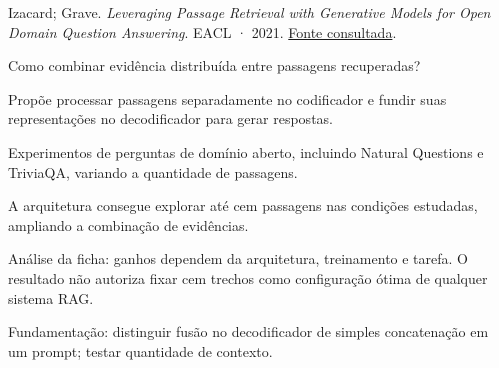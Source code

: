 {\small Izacard; Grave. \textit{Leveraging Passage Retrieval with Generative Models for Open Domain Question Answering}. EACL · 2021. \href{https://aclanthology.org/2021.eacl-main.74.pdf}{Fonte consultada}.\par}

Como combinar evidência distribuída entre passagens recuperadas?

Propõe processar passagens separadamente no codificador e fundir suas representações no decodificador para gerar respostas.

Experimentos de perguntas de domínio aberto, incluindo Natural Questions e TriviaQA, variando a quantidade de passagens.

A arquitetura consegue explorar até cem passagens nas condições estudadas, ampliando a combinação de evidências.

\begin{itemize}
\end{itemize}

Análise da ficha: ganhos dependem da arquitetura, treinamento e tarefa. O resultado não autoriza fixar cem trechos como configuração ótima de qualquer sistema RAG.

Fundamentação: distinguir fusão no decodificador de simples concatenação em um prompt; testar quantidade de contexto.

